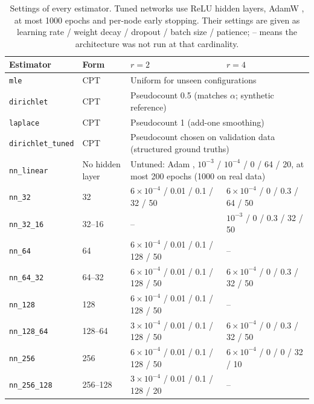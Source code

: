 \documentclass[a4paper,fleqn]{cas-sc}
\begin{document}
\begin{table}[htbp]
\caption{Settings of every estimator. Tuned networks use ReLU hidden layers, AdamW \citep{loshchilov2019decoupled}, at most 1000 epochs and per-node early stopping. Their settings are given as learning rate / weight decay / dropout / batch size / patience; -- means the architecture was not run at that cardinality.}\label{tab:estsettings}
\begin{tabular*}{\tblwidth}{@{\extracolsep{\fill}}lll l@{}}
\toprule
Estimator & Form & $r=2$ & $r=4$ \\
\midrule
\texttt{mle} & CPT & \multicolumn{2}{l}{Uniform for unseen configurations} \\
\texttt{dirichlet} & CPT & \multicolumn{2}{l}{Pseudocount 0.5 (matches $\alpha$; synthetic reference)} \\
\texttt{laplace} & CPT & \multicolumn{2}{l}{Pseudocount 1 (add-one smoothing)} \\
\texttt{dirichlet\_tuned} & CPT & \multicolumn{2}{l}{Pseudocount chosen on validation data (structured ground truths)} \\
\texttt{nn\_linear} & No hidden layer & \multicolumn{2}{l}{Untuned: Adam \citep{kingma2015adam}, $10^{-3}$ / $10^{-4}$ / 0 / 64 / 20, at most 200 epochs (1000 on real data)} \\
\texttt{nn\_32} & 32 & $6{\times}10^{-4}$ / 0.01 / 0.1 / 32 / 50 & $6{\times}10^{-4}$ / 0 / 0.3 / 64 / 50 \\
\texttt{nn\_32\_16} & 32--16 & -- & $10^{-3}$ / 0 / 0.3 / 32 / 50 \\
\texttt{nn\_64} & 64 & $6{\times}10^{-4}$ / 0.01 / 0.1 / 128 / 50 & -- \\
\texttt{nn\_64\_32} & 64--32 & $6{\times}10^{-4}$ / 0.01 / 0.1 / 128 / 50 & $6{\times}10^{-4}$ / 0 / 0.3 / 32 / 50 \\
\texttt{nn\_128} & 128 & $6{\times}10^{-4}$ / 0.01 / 0.1 / 128 / 50 & -- \\
\texttt{nn\_128\_64} & 128--64 & $3{\times}10^{-4}$ / 0.01 / 0.1 / 128 / 50 & $6{\times}10^{-4}$ / 0 / 0.3 / 32 / 50 \\
\texttt{nn\_256} & 256 & $6{\times}10^{-4}$ / 0.01 / 0.1 / 128 / 50 & $6{\times}10^{-4}$ / 0 / 0 / 32 / 10 \\
\texttt{nn\_256\_128} & 256--128 & $3{\times}10^{-4}$ / 0.01 / 0.1 / 128 / 20 & -- \\
\bottomrule
\end{tabular*}
\end{table}
\end{document}
